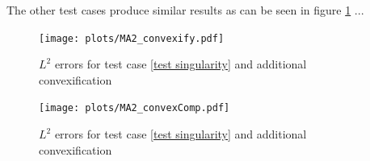 The other test cases produce similar results as can be seen in figure \ref{fig: l2 errors test singularity ourMethodConvex} ... \todo{}

\begin{figure}[H]
\centering
	\texttt{[image: plots/MA2\_convexify.pdf]}
	\caption{$L^2$ errors for test case \ref{test singularity} and additional convexification}
	\label{fig: l2 errors test singularity ourMethodConvex}
\end{figure}
\begin{figure}[H]
\centering
	\texttt{[image: plots/MA2\_convexComp.pdf]}
	\caption{$L^2$ errors for test case \ref{test singularity} and additional convexification}
	\label{fig: Compare test singularity ourMethodConvex}
\end{figure}

